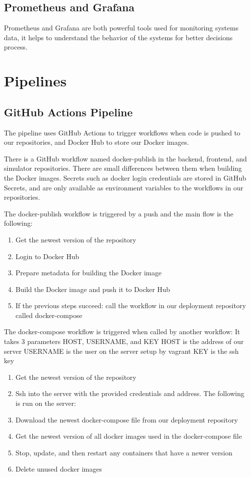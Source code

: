 \subsection{Prometheus and Grafana}
Prometheus and Grafana are both powerful tools used for monitoring systems data, it helps to understand the behavior of the systems for better decisions process.

\section{Pipelines}\label{sec:Pipelines}
\subsection{GitHub Actions Pipeline}\label{subsec: GithubActionsPipeline}
The pipeline uses GitHub Actions to trigger workflows when code is pushed to our repositories, and Docker Hub to store our Docker images.

There is a GitHub workflow named docker-publish in the backend, frontend, and simulator repositories.
There are small differences between them when building the Docker images.
Secrets such as docker login credentials are stored in GitHub Secrets, and are only available as environment variables to the workflows in our repositories.

The docker-publish workflow is triggered by a push and the main flow is the following:
\begin{enumerate}
\item Get the newest version of the repository
\item Login to Docker Hub
\item Prepare metadata for building the Docker image
\item Build the Docker image and push it to Docker Hub
\item If the previous steps succeed: call the workflow in our deployment repository called docker-compose
\end{enumerate}


The docker-compose workflow is triggered when called by another workflow:
It takes 3 parameters HOST, USERNAME, and KEY
HOST is the address of our server
USERNAME is the user on the server setup by vagrant
KEY is the ssh key
\begin{enumerate}
\item Get the newest version of the repository
\item Ssh into the server with the provided credentials and address. The following is run on the server:
\item Download the newest docker-compose file from our deployment repository
\item Get the newest version of all docker images used in the docker-compose file
\item Stop, update, and then restart any containers that have a newer version
\item Delete unused docker images
\end{enumerate}

